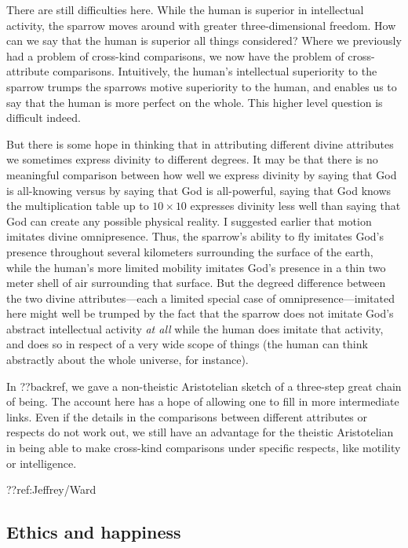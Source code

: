There are still difficulties here. While the human is superior in intellectual activity, the sparrow moves around
with greater three-dimensional freedom. How can we say that the human is superior all things considered? Where we
previously had a problem of cross-kind comparisons, we now have the problem of cross-attribute comparisons. 
Intuitively, the human's intellectual superiority to the sparrow trumps the sparrows motive superiority to the
human, and enables us to say that the human is more perfect on the whole. This higher level question is difficult
indeed. 

But there is some hope in thinking that in attributing different divine attributes we sometimes express divinity
to different degrees. It may be that there is no meaningful comparison between how well we express divinity by
saying that God is all-knowing versus by saying that God is all-powerful, saying that God knows the
multiplication table up to $10\times 10$ expresses divinity less well than saying that God can create any
possible physical reality. I suggested earlier that motion imitates divine omnipresence. Thus, the sparrow's
ability to fly imitates God's presence throughout several kilometers surrounding the surface of the earth, while
the human's more limited mobility imitates God's presence in a thin two meter shell of air surrounding that surface.
But the degreed difference between the two divine attributes---each a limited special case of omnipresence---imitated here 
might well be trumped by the fact that the sparrow does not imitate God's abstract intellectual activity \textit{at all}
while the human does imitate that activity, and does so in respect of a very wide scope of things (the human can think
abstractly about the whole universe, for instance). 

In ??backref, we gave a non-theistic Aristotelian sketch of a three-step great chain of being. The account here has
a hope of allowing one to fill in more intermediate links.
Even if the details in the comparisons between different attributes or respects do not work out, we still have an advantage 
for the theistic Aristotelian in being able to make cross-kind comparisons under specific respects, like motility or intelligence.

??ref:Jeffrey/Ward


\subsection{Ethics and happiness}


